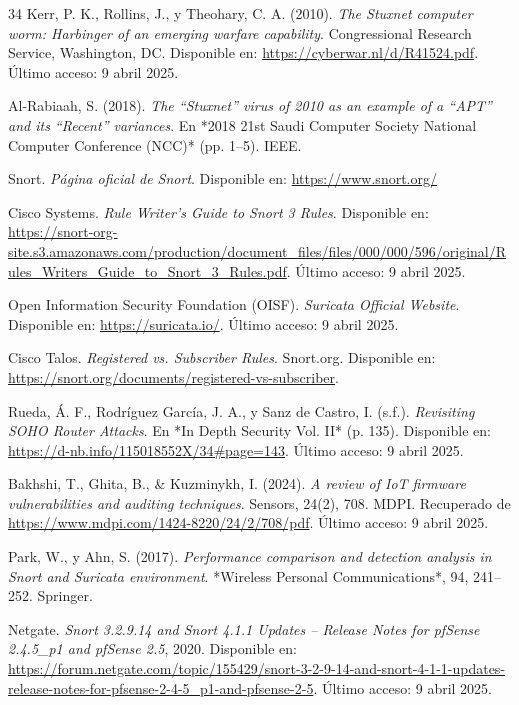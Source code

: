 \documentclass[11pt,a4paper,twoside]{report}
\begin{document}
\begin{thebibliography}{34}
	Kerr, P. K., Rollins, J., y Theohary, C. A. (2010). \textit{The Stuxnet computer worm: Harbinger of an emerging warfare capability}. Congressional Research Service, Washington, DC. Disponible en: \url{https://cyberwar.nl/d/R41524.pdf}. Último acceso: 9 abril 2025.
	
	Al-Rabiaah, S. (2018). \textit{The “Stuxnet” virus of 2010 as an example of a “APT” and its “Recent” variances}. En *2018 21st Saudi Computer Society National Computer Conference (NCC)* (pp. 1--5). IEEE.
	
	Snort. \textit{Página oficial de Snort}. Disponible en: \url{https://www.snort.org/}
	
	Cisco Systems. \textit{Rule Writer’s Guide to Snort 3 Rules}. Disponible en: \url{https://snort-org-site.s3.amazonaws.com/production/document_files/files/000/000/596/original/Rules_Writers_Guide_to_Snort_3_Rules.pdf}. Último acceso: 9 abril 2025.
	
	Open Information Security Foundation (OISF). \textit{Suricata Official Website}. Disponible en: \url{https://suricata.io/}. Último acceso: 9 abril 2025.
	
	Cisco Talos. \textit{Registered vs. Subscriber Rules}. Snort.org. Disponible en: \url{https://snort.org/documents/registered-vs-subscriber}.
	
	Rueda, Á. F., Rodríguez García, J. A., y Sanz de Castro, I. (s.f.). \textit{Revisiting SOHO Router Attacks}. En *In Depth Security Vol. II* (p. 135). Disponible en: \url{https://d-nb.info/115018552X/34#page=143}. Último acceso: 9 abril 2025.
	
	Bakhshi, T., Ghita, B., \& Kuzminykh, I. (2024). \textit{A review of IoT firmware vulnerabilities and auditing techniques}. Sensors, 24(2), 708. MDPI. Recuperado de \url{https://www.mdpi.com/1424-8220/24/2/708/pdf}. Último acceso: 9 abril 2025.
	
	Park, W., y Ahn, S. (2017). \textit{Performance comparison and detection analysis in Snort and Suricata environment}. *Wireless Personal Communications*, 94, 241--252. Springer.
	
Netgate. \textit{Snort 3.2.9.14 and Snort 4.1.1 Updates – Release Notes for pfSense 2.4.5\_p1 and pfSense 2.5}, 2020. Disponible en: 
\href{https://forum.netgate.com/topic/155429/snort-3-2-9-14-and-snort-4-1-1-updates-release-notes-for-pfsense-2-4-5_p1-and-pfsense-2-5}{https://forum.netgate.com/topic/155429/snort-3-2-9-14-and-snort-4-1-1-updates-release-notes-for-pfsense-2-4-5\_p1-and-pfsense-2-5}.
Último acceso: 9 abril 2025.
	

\end{thebibliography}
\end{document}
